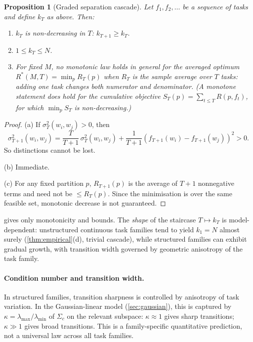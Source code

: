 \documentclass[12pt]{article}
\newtheorem{proposition}[theorem]{Proposition}
\newcommand{\sigmasq}{\sigma^2}
\begin{document}
\begin{proposition}[Graded separation cascade]\label{prop:cascade}
Let $f_1, f_2, \ldots$ be a sequence of tasks and define $k_T$ as above. Then:

\begin{enumerate}[label=(\alph*)]
\item $k_T$ is non-decreasing in $T$: $k_{T+1} \ge k_T$.
\item $1 \le k_T \le N$.
\item For fixed $M$, no monotonic law holds in general for the \emph{averaged} optimum $R^*(M, T) = \min_p R_T(p)$ when $R_T$ is the sample average over $T$ tasks: adding one task changes both numerator and denominator. (A monotone statement does hold for the cumulative objective $S_T(p) = \sum_{t \le T} R(p, f_t)$, for which $\min_p S_T$ is non-decreasing.)
\end{enumerate}
\end{proposition}

\begin{proof}
(a) If $\sigmasq_T(w_i, w_j) > 0$, then
\[
\sigmasq_{T+1}(w_i, w_j) = \frac{T}{T+1}\,\sigmasq_T(w_i, w_j) + \frac{1}{T+1}(f_{T+1}(w_i) - f_{T+1}(w_j))^2 > 0.
\]
So distinctions cannot be lost.

(b) Immediate.

(c) For any fixed partition $p$, $R_{T+1}(p)$ is the average of $T+1$ nonnegative terms and need not be $\le R_T(p)$. Since the minimisation is over the same feasible set, monotonic decrease is not guaranteed.
\end{proof}

 gives only monotonicity and bounds. The \emph{shape} of the staircase $T \mapsto k_T$ is model-dependent: unstructured continuous task families tend to yield $k_1 = N$ almost surely (\cref{thm:empirical}(d), trivial cascade), while structured families can exhibit gradual growth, with transition width governed by geometric anisotropy of the task family.

\paragraph{Condition number and transition width.}\label{rem:condition-number}
In structured families, transition sharpness is controlled by anisotropy of task variation. In the Gaussian-linear model (\cref{sec:gaussian}), this is captured by $\kappa = \lambda_{\max}/\lambda_{\min}$ of $\Sigma_c$ on the relevant subspace: $\kappa \approx 1$ gives sharp transitions; $\kappa \gg 1$ gives broad transitions. This is a family-specific quantitative prediction, not a universal law across all task families.
\end{document}
